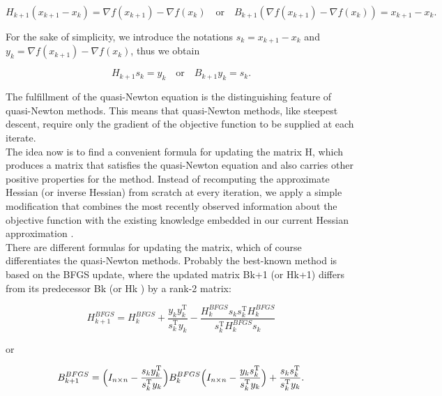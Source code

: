 \begin{equation*}
    H_{k+1} (x_{k+1} - x_k) = \nabla f(x_{k+1}) - \nabla f(x_k) \quad \text{or} \quad B_{k+1} (\nabla f(x_{k+1}) - \nabla f(x_k)) = x_{k+1} - x_k.
\end{equation*}

For the sake of simplicity, we introduce the notations $s_k = x_{k+1} - x_k$ and $y_k = \nabla f(x_{k+1}) - \nabla f(x_k)$, thus we obtain

\begin{equation}\label{quasi-NewtonEquation}
    H_{k+1} s_k = y_k \quad \text{or} \quad B_{k+1} y_k = s_k.
\end{equation}

The fulfillment of the quasi-Newton equation is the distinguishing feature of quasi-Newton methods. This means that quasi-Newton methods, like steepest descent, require only the gradient of the objective function to be supplied at each iterate. \\
The idea now is to find a convenient formula for updating the matrix H, which produces a matrix that satisfies the quasi-Newton equation and also carries other positive properties for the method. Instead of recomputing the approximate Hessian (or inverse Hessian) from scratch at every iteration, we apply a simple modification that combines the most recently observed information about the objective function with the existing knowledge embedded in our current Hessian approximation \cite[p.~139]{NocedalWright:2006}. \\
There are different formulas for updating the matrix, which of course differentiates the quasi-Newton methods. Probably the best-known method is based on the BFGS update, where the updated matrix Bk+1 (or Hk+1) differs from its
predecessor Bk (or Hk ) by a rank-2 matrix:

\begin{equation*}
    H^{BFGS}_{k+1} = H^{BFGS}_k + \frac{y_k y^{\mathrm{T}}_k}{s^{\mathrm{T}}_k y_k} - \frac{H^{BFGS}_k s_k s^{\mathrm{T}}_k H^{BFGS}_k}{s^{\mathrm{T}}_k H^{BFGS}_k s_k}
\end{equation*}

or 

\begin{equation}\label{InverseBFGSformula}
    B^{BFGS}_{k+1} = \Big{(} I_{n \times n} - \frac{s_k y^{\mathrm{T}}_k}{s_k^{\mathrm{T}} y_k} \Big{)} B^{BFGS}_k \Big{(} I_{n \times n} - \frac{y_k s^{\mathrm{T}}_k}{s_k^{\mathrm{T}} y_k} \Big{)} + \frac{s_k s^{\mathrm{T}}_k}{s_k^{\mathrm{T}} y_k}.
\end{equation}

